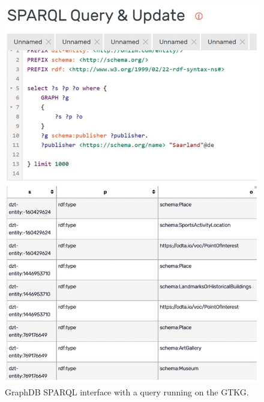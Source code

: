 \documentclass[12pt]{article}
\begin{document}
\begin{figure}
    \includegraphics[width=\linewidth]{imgs/query-example.jpeg}
    \caption{GraphDB SPARQL interface with a query running on the GTKG.}
    \label{fig:query-example}
\end{figure}
\end{document}
